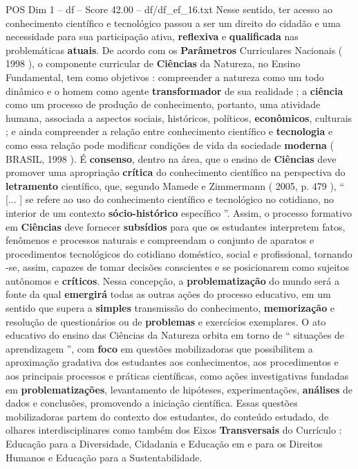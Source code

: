 \begin{textsample}{POS Dim 1 – df – Score 42.00 – df/df\_ef\_16.txt}
Nesse sentido, ter acesso ao conhecimento científico e tecnológico passou a ser um direito do cidadão e uma necessidade para sua participação ativa, \textbf{reflexiva} e \textbf{qualificada} nas problemáticas \textbf{atuais}.
De acordo com os \textbf{Parâmetros} Curriculares Nacionais ( 1998 ), o componente curricular de \textbf{Ciências} da Natureza, no Ensino Fundamental, tem como objetivos : compreender a natureza como um todo dinâmico e o homem como agente \textbf{transformador} de sua realidade ; a \textbf{ciência} como um processo de produção de conhecimento, portanto, uma atividade humana, associada a aspectos sociais, históricos, políticos, \textbf{econômicos}, culturais ; e ainda compreender a relação entre conhecimento científico e \textbf{tecnologia} e como essa relação pode modificar condições de vida da sociedade \textbf{moderna} ( BRASIL, 1998 ).
É \textbf{consenso}, dentro na área, que o ensino de \textbf{Ciências} deve promover uma apropriação \textbf{crítica} do conhecimento científico na perspectiva do \textbf{letramento} científico, que, segundo Mamede e Zimmermann ( 2005, p. 479 ), “ [... ] se refere ao uso do conhecimento científico e tecnológico no cotidiano, no interior de um contexto \textbf{sócio-histórico} específico ”.
Assim, o processo formativo em \textbf{Ciências} deve fornecer \textbf{subsídios} para que os estudantes interpretem fatos, fenômenos e processos naturais e compreendam o conjunto de aparatos e procedimentos tecnológicos do cotidiano doméstico, social e profissional, tornando -se, assim, capazes de tomar decisões conscientes e se posicionarem como sujeitos autônomos e \textbf{críticos}.
Nessa concepção, a \textbf{problematização} do mundo será a fonte da qual \textbf{emergirá} todas as outras ações do processo educativo, em um sentido que supera a \textbf{simples} transmissão do conhecimento, \textbf{memorização} e resolução de questionários ou de \textbf{problemas} e exercícios exemplares.
O ato educativo do ensino das Ciências da Natureza orbita em torno de “ situações de aprendizagem ”, com \textbf{foco} em questões mobilizadoras que possibilitem a aproximação gradativa dos estudantes aos conhecimentos, aos procedimentos e aos principais processos e práticas científicas, como ações investigativas fundadas em \textbf{problematizações}, levantamento de hipóteses, experimentações, \textbf{análises} de dados e conclusões, promovendo a iniciação científica.
Essas questões mobilizadoras partem do contexto dos estudantes, do conteúdo estudado, de olhares interdisciplinares como também dos Eixos \textbf{Transversais} do Currículo : Educação para a Diversidade, Cidadania e Educação em e para os Direitos Humanos e Educação para a Sustentabilidade.

\end{textsample}
